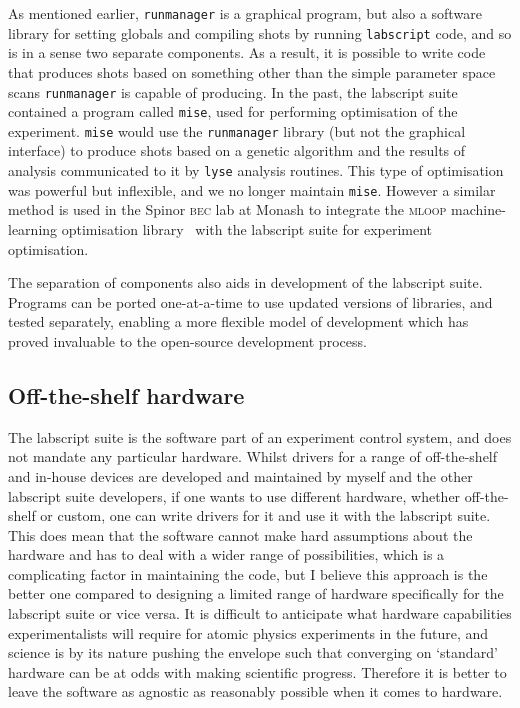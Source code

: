As mentioned earlier, \texttt{runmanager} is a graphical program, but also a software library for setting globals and compiling shots by running \texttt{labscript} code, and so is in a sense two separate components. As a result, it is possible to write code that produces shots based on something other than the simple parameter space scans \texttt{runmanager} is capable of producing. In the past, the labscript suite contained a program called \texttt{mise}, used for performing optimisation of the experiment. \texttt{mise} would use the \texttt{runmanager} library (but not the graphical interface) to produce shots based on a genetic algorithm and the results of analysis communicated to it by \texttt{lyse} analysis routines. This type of optimisation was powerful but inflexible, and we no longer maintain \texttt{mise}. However a similar method is used in the Spinor \textsc{bec} lab at Monash to integrate the \textsc{mloop} machine-learning optimisation library~\cite{wigley_fast_2016} with the labscript suite for experiment optimisation.

The separation of components also aids in development of the labscript suite. Programs can be ported one-at-a-time to use updated versions of libraries, and tested separately, enabling a more flexible model of development which has proved invaluable to the open-source development process. 


\subsection{Off-the-shelf hardware}

The labscript suite is the software part of an experiment control system, and does not mandate any particular hardware. Whilst drivers for a range of off-the-shelf and in-house devices are developed and maintained by myself and the other labscript suite developers, if one wants to use different hardware, whether off-the-shelf or custom, one can write drivers for it and use it with the labscript suite. This does mean that the software cannot make hard assumptions about the hardware and has to deal with a wider range of possibilities, which is a complicating factor in maintaining the code, but I believe this approach is the better one compared to designing a limited range of hardware specifically for the labscript suite or vice versa. It is difficult to anticipate what hardware capabilities experimentalists will require for atomic physics experiments in the future, and science is by its nature pushing the envelope such that converging on `standard' hardware can be at odds with making scientific progress. Therefore it is better to leave the software as agnostic as reasonably possible when it comes to hardware.

